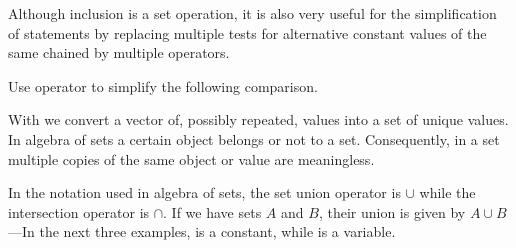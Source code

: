 \documentclass[krantz2]{krantz}\usepackage{knitr}%
\begin{document}
Although inclusion is a set operation, it is also very useful for the simplification of  statements by replacing multiple tests for alternative constant values of the same  chained by multiple \Roperator{|} operators.

\begin{playground}
Use operator  to simplify the following comparison.

\begin{knitrout}\footnotesize
{}\color{fgcolor}\begin{kframe}
\begin{alltt}
 \hlkwb{<-} \hlstd{(}\hlstd{,} \hlstd{,} \hlstd{)}
 \hlopt{==}  \hlopt{|}  \hlopt{==}  \hlopt{|}  \hlopt{==}  \hlopt{|}  \hlopt{==} 
\end{alltt}
\end{kframe}
\end{knitrout}
\end{playground}

With  we convert a vector of, possibly repeated, values into a set of unique values. In algebra of sets a certain object belongs or not to a set. Consequently, in a set multiple copies of the same object or value are meaningless.

\begin{knitrout}\footnotesize
{}\color{fgcolor}
\end{knitrout}

In the notation used in algebra of sets, the set union operator is $\cup$ while the intersection operator is $\cap$. If we have sets $A$ and $B$, their union is given by $A \cup B$---In the next three examples,  is a constant, while  is a variable.
\end{document}
